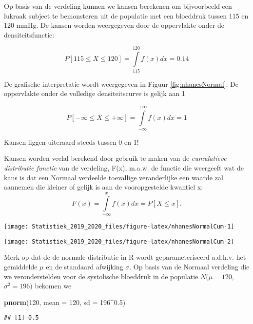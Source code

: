 \documentclass[12pt,dutch,coursenotes]{book}
\newenvironment{Shaded}{\begin{snugshade}}{\end{snugshade}}
\newcommand{\KeywordTok}[1]{\textcolor[rgb]{0.13,0.29,0.53}{\textbf{#1}}}
\newcommand{\DataTypeTok}[1]{\textcolor[rgb]{0.13,0.29,0.53}{#1}}
\newcommand{\DecValTok}[1]{\textcolor[rgb]{0.00,0.00,0.81}{#1}}
\newcommand{\FloatTok}[1]{\textcolor[rgb]{0.00,0.00,0.81}{#1}}
\newcommand{\OperatorTok}[1]{\textcolor[rgb]{0.81,0.36,0.00}{\textbf{#1}}}
\newcommand{\NormalTok}[1]{#1}
\theoremstyle{definition}
\theoremstyle{definition}
\theoremstyle{definition}
\theoremstyle{remark}
\begin{document}
Op basis van de verdeling kunnen we kansen berekenen om bijvoorbeeld een
lukraak subject te bemonsteren uit de populatie met een bloeddruk tussen
115 en 120 mmHg. De kansen worden weergegeven door de oppervlakte onder
de densiteitsfunctie:

\[P[115\leq  X\leq 120]= \int\limits_{115}^{120} f(x) dx = 0.14\]

De grafische interpretatie wordt weergegeven in Figuur
\ref{fig:nhanesNormal}. De oppervlakte onder de volledige
densiteitscurve is gelijk aan 1

\[P[-\infty\leq X \leq +\infty]=\int\limits_{-\infty}^{+\infty} f(x) dx=1\]

Kansen liggen uiteraard steeds tussen 0 en 1!

Kansen worden veelal berekend door gebruik te maken van de
\emph{cumulatieve distributie functie} van de verdeling, F(x), m.a.w. de
functie die weergeeft wat de kans is dat een Normaal verdeelde
toevallige veranderlijke een waarde zal aannemen die kleiner of gelijk
is aan de vooropgestelde kwantiel x:
\[F(x)=\int\limits_{-\infty}^x f(x) dx  = P[X\leq x].\]

\begin{center}\texttt{[image: Statistiek\_2019\_2020\_files/figure-latex/nhanesNormalCum-1]} \end{center}

\begin{center}\texttt{[image: Statistiek\_2019\_2020\_files/figure-latex/nhanesNormalCum-2]} \end{center}

Merk op dat de de normale distributie in R wordt geparameteriseerd
a.d.h.v. het gemiddelde \(\mu\) en de standaard afwijking \(\sigma\). Op
basis van de Normaal verdeling die we veronderstelden voor de
systolische bloeddruk in de populatie \(N(\mu=120\),\(\sigma^2=196)\)
bekomen we

\begin{Shaded}
\begin{Highlighting}[]
\KeywordTok{pnorm}\NormalTok{(}\DecValTok{120}\NormalTok{, }\DataTypeTok{mean =} \DecValTok{120}\NormalTok{, }\DataTypeTok{sd =} \DecValTok{196}\OperatorTok{^}\FloatTok{0.5}\NormalTok{)}
\end{Highlighting}
\end{Shaded}

\begin{verbatim}
## [1] 0.5
\end{verbatim}
\end{document}
